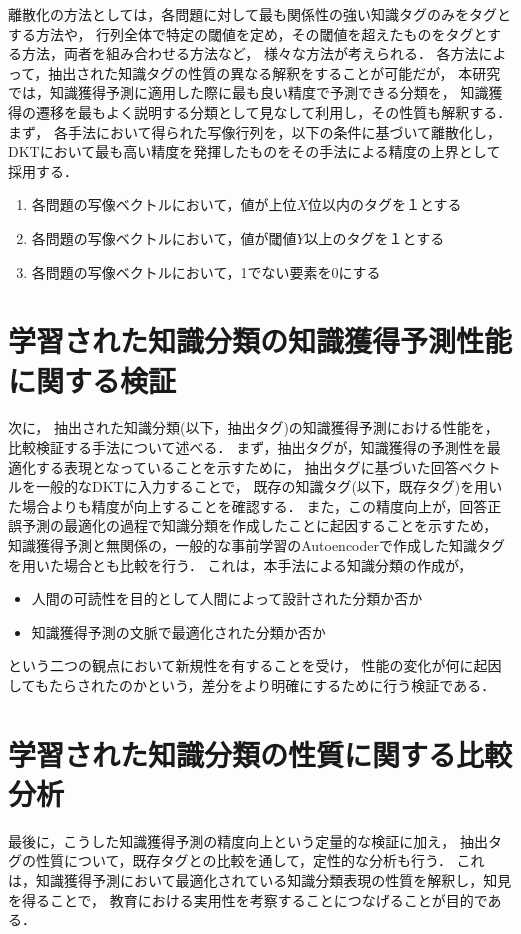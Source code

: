 離散化の方法としては，各問題に対して最も関係性の強い知識タグのみをタグとする方法や，
行列全体で特定の閾値を定め，その閾値を超えたものをタグとする方法，両者を組み合わせる方法など，
様々な方法が考えられる．
各方法によって，抽出された知識タグの性質の異なる解釈をすることが可能だが，
本研究では，知識獲得予測に適用した際に最も良い精度で予測できる分類を，
知識獲得の遷移を最もよく説明する分類として見なして利用し，その性質も解釈する．
まず，
各手法において得られた写像行列を，以下の条件に基づいて離散化し，
DKTにおいて最も高い精度を発揮したものをその手法による精度の上界として採用する．
\begin{enumerate}
\item 各問題の写像ベクトルにおいて，値が上位$X$位以内のタグを１とする
\item 各問題の写像ベクトルにおいて，値が閾値$Y$以上のタグを１とする
\item 各問題の写像ベクトルにおいて，1でない要素を0にする
\end{enumerate}


\section{学習された知識分類の知識獲得予測性能に関する検証}
次に，
抽出された知識分類(以下，抽出タグ)の知識獲得予測における性能を，比較検証する手法について述べる．
まず，抽出タグが，知識獲得の予測性を最適化する表現となっていることを示すために，
抽出タグに基づいた回答ベクトルを一般的なDKTに入力することで，
既存の知識タグ(以下，既存タグ)を用いた場合よりも精度が向上することを確認する．
また，この精度向上が，回答正誤予測の最適化の過程で知識分類を作成したことに起因することを示すため，
知識獲得予測と無関係の，一般的な事前学習のAutoencoderで作成した知識タグを用いた場合とも比較を行う．
これは，本手法による知識分類の作成が，
\begin{itemize}
	\item 人間の可読性を目的として人間によって設計された分類か否か
	\item 知識獲得予測の文脈で最適化された分類か否か
\end{itemize}
という二つの観点において新規性を有することを受け，
性能の変化が何に起因してもたらされたのかという，差分をより明確にするために行う検証である．




\section{学習された知識分類の性質に関する比較分析}
最後に，こうした知識獲得予測の精度向上という定量的な検証に加え，
抽出タグの性質について，既存タグとの比較を通して，定性的な分析も行う．
これは，知識獲得予測において最適化されている知識分類表現の性質を解釈し，知見を得ることで，
教育における実用性を考察することにつなげることが目的である．

